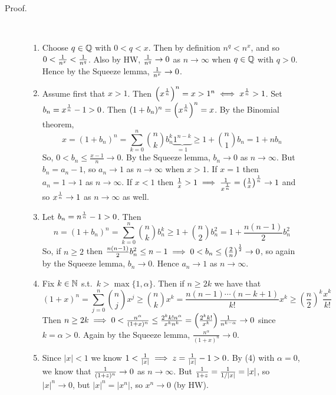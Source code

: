 \documentclass[letterpaper,11pt]{article}
\begin{document}
\begin{description}
\item[Proof.]\text{}\vspace{-0.2in}\\
  \begin{enumerate}[1)]
  \item Choose $q\in\mathbb{Q}$ with $0<q<x$. Then by definition $n^q<n^x$,
      and so $0<\frac{1}{n^x}<\frac{1}{n^q}$. Also by HW,
      $\frac{1}{n^q}\to0$ as $n\to\infty$ when $q\in\mathbb{Q}$ with $q>0$.
      Hence by the Squeeze lemma, $\frac{1}{n^x}\to0$.
  \item Assume first that $x>1$. Then
      $\left(x^{\frac{1}{n}}\right)^n=x>1^n\iff x^{\frac{1}{n}}>1$.
      Set $b_n=x^{\frac{1}{n}}-1>0$. Then
      $(1+b_n)^n=\left(x^{\frac{1}{n}}\right)^n=x$. By the Binomial theorem,
      \[
      x=(1+b_n)^n=\sum_{k=0}^n\binom{n}{k}b_n^k\underbrace{1^{n-k}}_{=1}
      \ge 1+\binom{n}{1}b_n=1+nb_n
      \]
      So, $0<b_n\le\frac{x-1}{n}\to0$. By the Squeeze lemma, $b_n\to0$
      as $n\to\infty$. But $b_n=a_n-1$, so $a_n\to1$ as $n\to\infty$ when $x>1$.
      If $x=1$ then $a_n=1\to1$ as $n\to\infty$. If $x<1$ then $\frac{1}{x}>1
      \implies \frac{1}{x^{\frac{1}{n}}}=\left(\frac{1}{x}\right)^{\frac{1}{n}}\to1$
      and so $x^{\frac{1}{n}}\to1$ as $n\to\infty$ as well.
  \item Let $b_n=n^{\frac{1}{n}}-1>0$. Then
      \[
      n=(1+b_n)^n=\sum_{k=0}^n\binom{n}{k}b_n^k\ge 1+\binom{n}{2}b_n^2
      =1+\frac{n(n-1)}{2}b_n^2
      \]
      So, if $n\ge 2$ then $\frac{n(n-1)}{2}b_n^2\le n-1\implies 0< b_n\le
      \left(\frac{2}{n}\right)^{\frac{1}{2}}\to0$, so again by the
      Squeeze lemma, $b_n\to0$. Hence $a_n\to 1$ as $n\to\infty$.
  \item Fix $k\in\mathbb{N}$ s.t.\ $k>\max\{1,\alpha\}$. Then if $n\ge 2k$ we have
      that \[
      (1+x)^n=\sum_{j=0}^n\binom{n}{j}x^j\ge\binom{n}{k}x^k=
        \frac{n(n-1)\cdots(n-k+1)}{k!}x^k
        \ge\left(\frac{n}{2}\right)^k\frac{x^k}{k!}
      \]
      Then $n\ge 2k\implies 0<\frac{n^\alpha}{(1+x)^n}
        \le \frac{2^kk!n^\alpha}{x^kn^k}
        =\left(\frac{2^kk!}{x^k}\right)\frac{1}{n^{k-\alpha}}
        \to0$ since $k=\alpha>0$. Again by the Squeeze lemma,
        $\frac{n^\alpha}{(1+x)^n}\to0$.
  \item Since $|x|<1$ we know $1<\frac{1}{|x|}\implies z=\frac{1}{|x|}-1>0$.
      By (4) with $\alpha=0$, we know that $\frac{1}{(1+z)^n}\to0$
      as $n\to\infty$. But $\frac{1}{1+z}=\frac{1}{1/|x|}=|x|$, so
      $|x|^n\to0$, but $|x|^n=|x^n|$, so $x^n\to0$ (by HW).
  \end{enumerate}
\end{description}
\end{document}
